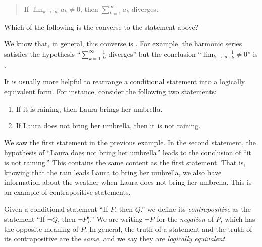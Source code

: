 \documentclass{ximera}
\begin{document}
\begin{exercise}
\begin{quote}
If $\lim_{k \rightarrow \infty} a_k \neq 0$, then $\sum_{k = 1}^\infty a_k$ diverges.
\end{quote}

Which of the following is the converse to the statement above?
\begin{multipleChoice}
\end{multipleChoice}

We know that, in general, this converse is
.
For example, the harmonic series satisfies the hypothesis ``$\sum_{k = 1}^\infty \frac{1}{k}$ diverges'' but the conclusion ``$\lim_{k \rightarrow \infty} \frac{1}{k} \neq 0$'' is
.


\begin{exercise}
It is usually more helpful to rearrange a conditional statement into a logically equivalent form.  For instance, consider the following two statements:

\begin{enumerate}
	\item If it is raining, then Laura brings her umbrella.
	\item If Laura does not bring her umbrella, then it is not raining.
\end{enumerate}

We saw the first statement in the previous example.  In the second statement, the hypothesis of ``Laura does not bring her umbrella'' leads to the conclusion of ``it is not raining.''  This contains the same content as the first statement.  That is, knowing that the rain leads Laura to bring her umbrella, we also have information about the weather when Laura does not bring her umbrella.  This is an example of contrapositive statements.

\begin{definition}
Given a conditional statement ``If $P$, then $Q$.'' we define its \emph{contrapositive} as the statement ``If $\neg Q$, then $\neg P$).''  We are writing $\neg P$ for the \emph{negation} of $P$, which has the opposite meaning of $P$.  In general, the truth of a statement and the truth of its contrapositive are the \emph{same}, and we say they are \emph{logically equivalent}.
\end{definition}


\end{exercise}
\end{exercise}
\end{document}
